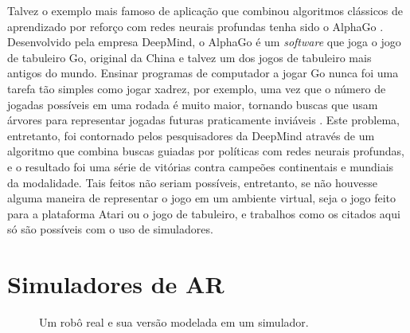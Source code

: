 \documentclass[cic,tc]{iiufrgs}
\begin{document}
Talvez o exemplo mais famoso de aplicação que combinou algoritmos clássicos de
aprendizado por reforço com redes neurais profundas tenha sido o AlphaGo \cite{Silver2016}.
Desenvolvido pela empresa DeepMind, o AlphaGo é um \textit{software} que joga o
jogo de tabuleiro Go, original da China e talvez um dos jogos de tabuleiro mais
antigos do mundo. Ensinar programas de computador a jogar Go nunca foi uma
tarefa tão simples como jogar xadrez, por exemplo, uma vez que o número de
jogadas possíveis em uma rodada é muito maior, tornando buscas que usam árvores
para representar jogadas futuras praticamente inviáveis \cite{705737}. Este problema,
entretanto, foi contornado pelos pesquisadores da DeepMind através de um
algoritmo que combina buscas guiadas por políticas com redes neurais profundas,
e o resultado foi uma série de vitórias contra campeões continentais e mundiais
da modalidade. Tais feitos não seriam possíveis, entretanto, se não houvesse
alguma maneira de representar o jogo em um ambiente virtual, seja o jogo feito
para a plataforma Atari ou o jogo de tabuleiro, e trabalhos como os citados aqui
só são possíveis com o uso de simuladores.



\section{Simuladores de AR}
\label{simuladores_ar}
\begin{figure}[h]
    \caption{Um robô real e sua versão modelada em um simulador.}
    \begin{center}
    \end{center}
    \label{fig:mujocosimulator}
\end{figure}
\end{document}
